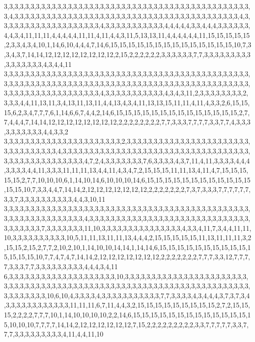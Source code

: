 3,3,3,3,3,3,3,3,3,3,3,3,3,3,3,3,3,3,3,3,3,3,3,3,3,3,3,3,3,3,3,3,3,3,3,3,3,3,3,3,3,3,3,3,3,3,3,4,3,3,3,3,3,3,3,3,3,3,3,3,3,3,3,3,3,3,3,3,3,3,3,3,3,3,3,3,3,3,3,3,3,3,3,3,3,3,3,3,3,3,4,3,3,3,3,3,3,3,3,3,3,3,3,3,3,3,3,3,3,3,4,3,3,3,3,3,3,3,3,3,3,3,4,4,4,4,4,3,3,4,4,4,3,3,3,3,3,3,4,4,3,4,11,11,11,4,4,4,4,4,11,11,4,11,4,4,3,11,5,13,13,11,4,4,4,4,4,4,11,15,15,15,15,15,2,3,3,4,3,4,10,1,14,6,10,4,4,4,7,14,6,15,15,15,15,15,15,15,15,15,15,15,15,15,15,10,7,3,3,4,3,7,14,14,12,12,12,12,12,12,12,12,2,15,2,2,2,2,2,2,3,3,3,3,3,3,7,7,3,3,3,3,3,3,3,3,3,3,3,3,3,3,3,3,4,3,4,4,11
3,3,3,3,3,3,3,3,3,3,3,3,3,3,3,3,3,3,3,3,3,3,3,3,3,3,3,3,3,3,3,3,3,3,3,3,3,3,3,3,3,3,3,3,3,3,3,3,3,3,3,3,3,3,3,3,3,3,3,3,3,3,3,3,3,3,3,3,3,3,3,3,3,3,3,3,3,3,3,3,3,3,3,3,3,3,3,3,3,3,3,3,3,3,3,3,3,3,3,3,3,3,3,3,3,3,3,3,3,3,4,3,3,3,3,3,3,3,3,3,3,3,4,3,4,3,11,2,3,3,3,3,3,3,3,3,2,3,3,3,4,4,11,13,11,3,4,13,11,13,11,4,4,13,4,3,4,11,13,13,15,11,11,4,11,4,3,3,2,6,15,15,15,6,2,3,4,7,7,7,6,1,14,6,6,7,4,4,2,14,6,15,15,15,15,15,15,15,15,15,15,15,15,15,15,2,7,7,4,4,4,7,14,14,12,12,12,12,12,12,12,12,2,2,2,2,2,2,2,2,7,7,3,3,3,7,7,7,7,3,3,7,7,4,3,3,3,3,3,3,3,3,3,3,4,4,3,3,2
3,3,3,3,3,3,3,3,3,3,3,3,3,3,3,3,3,3,3,3,3,3,2,3,3,3,3,3,3,3,3,3,3,3,3,3,3,3,3,3,3,3,3,3,3,3,3,3,3,3,3,3,3,3,3,3,4,3,3,3,3,3,3,3,3,3,3,3,3,3,3,3,3,3,3,3,3,3,3,3,3,3,3,3,3,3,3,3,3,3,3,3,3,3,3,3,3,3,3,3,3,3,3,3,3,3,3,4,7,2,4,3,3,3,3,3,3,3,7,6,3,3,3,3,4,3,7,11,4,11,3,3,3,3,4,4,4,3,3,3,3,4,4,11,3,3,3,11,11,11,13,4,4,11,4,3,4,7,2,15,15,15,11,11,13,4,11,4,7,15,15,15,15,15,2,7,7,10,10,10,6,1,14,10,14,6,10,10,10,14,6,15,15,15,15,15,15,15,15,15,15,15,15,15,15,10,7,3,3,4,4,7,14,14,2,12,12,12,12,12,12,12,2,2,2,2,2,2,2,7,3,7,3,3,3,7,7,7,7,7,7,3,3,7,3,3,3,3,3,3,3,3,3,3,4,4,3,10,11
3,3,3,3,3,3,3,3,3,3,3,3,3,3,3,3,3,3,3,3,3,3,3,3,3,3,3,3,3,3,3,3,3,3,3,3,3,3,3,3,3,3,3,3,3,3,3,3,3,3,3,3,3,3,3,3,3,3,3,3,3,4,3,3,3,3,3,3,3,3,3,3,3,3,3,3,3,3,3,3,3,3,3,3,3,3,3,3,3,3,3,3,3,3,3,3,3,3,3,7,3,3,3,3,3,3,3,11,10,3,3,3,3,3,3,3,3,3,3,3,3,3,3,3,4,3,3,4,11,7,3,4,4,11,11,10,3,3,3,3,3,3,3,3,3,3,10,5,11,11,13,11,11,13,4,4,4,2,15,15,15,15,15,11,13,11,11,11,3,2,15,15,2,15,2,7,7,2,10,2,10,1,14,10,10,14,14,1,14,14,6,15,15,15,15,15,15,15,15,15,15,15,15,15,15,10,7,7,4,7,4,7,14,14,2,12,12,12,12,12,12,12,2,2,2,2,2,2,2,7,7,7,3,3,12,7,7,7,7,3,3,3,7,7,3,3,3,3,3,3,3,3,3,4,4,4,3,4,11
6,3,3,3,3,3,3,3,3,3,3,3,3,3,3,3,3,3,3,3,3,10,3,3,3,3,3,3,3,3,3,3,3,3,3,3,3,3,3,3,3,3,3,3,3,3,3,3,3,3,3,3,3,3,3,3,3,3,3,3,3,3,3,3,3,3,3,3,3,3,3,3,3,3,3,3,3,3,3,3,3,3,3,3,3,3,3,3,3,3,3,3,3,3,3,3,3,3,3,10,6,10,4,3,3,3,3,4,3,3,3,3,3,3,3,3,3,3,3,7,7,3,3,3,3,4,3,4,4,4,3,7,3,7,3,4,3,3,3,3,3,3,3,3,3,3,3,3,11,11,11,6,7,11,4,4,3,2,15,15,15,15,15,15,15,15,15,2,7,2,15,15,15,2,2,2,2,7,7,7,10,1,14,10,10,10,10,2,2,14,6,15,15,15,15,15,15,15,15,15,15,15,15,15,15,10,10,10,7,7,7,7,14,14,2,12,12,12,12,12,12,7,15,2,2,2,2,2,2,2,2,2,3,3,7,7,7,7,7,3,3,7,7,7,3,3,3,3,3,3,3,3,3,4,11,4,4,11,10
